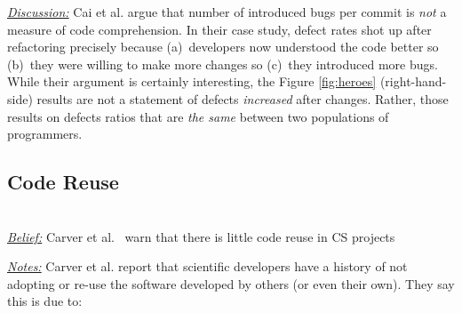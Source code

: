 \documentclass[sigconf,review,anonymous]{acmart}
\begin{document}




\noindent \textit{\underline{Discussion:}} 
Cai et al. \cite{cai19_debt} argue that number of introduced bugs
per commit is {\em not} a measure of code comprehension.
In their case study, defect rates shot up after refactoring
precisely because (a)~developers now understood the code better so (b)~they were willing to make more changes so (c)~they
introduced more bugs. While their argument is certainly interesting, the Figure \ref{fig:heroes} (right-hand-side) results
are not a statement of defects {\em increased} after changes.
Rather, those results on defects ratios that are {\em the same} between two populations of programmers. 




\subsection{Code Reuse} ~\\
\noindent \textit{\underline{Belief:}} 
Carver et al.~\cite{segal07_problem, carver06_hpc, Shull05_parallel, sanders08_risk} warn that there is little
code reuse in CS projects

\noindent \textit{\underline{Notes:}} 
Carver et al. report that scientific developers have a history of not adopting or re-use the software developed by others (or even their own). They 
say this is due to:
\end{document}
